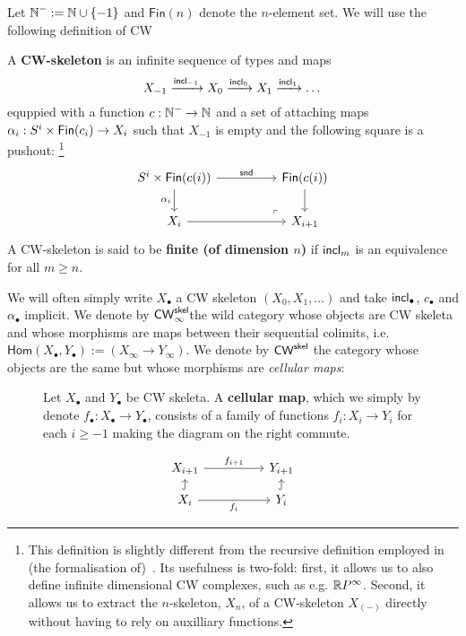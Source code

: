 \documentclass[a4page]{article}
\begin{document}
Let $\textsf{$\mathbb{N}$}^{-} := \textsf{$\mathbb{N}$} \cup \{-1\}$ and $\mathsf{Fin}(n)$ denote the $n$-element set. We will use the following definition of CW
\begin{definition}[CW skeleta]
  A \textbf{CW-skeleton} is an infinite sequence of types and maps
  \[X_{-1} \xrightarrow{\textnormal{\ensuremath{\mathsf{incl}_{-1}}}} X_0 \xrightarrow{\textnormal{\ensuremath{\mathsf{incl}_{0}}}} X_1 \xrightarrow{\textnormal{\ensuremath{\mathsf{incl}_{1}}}} \dots \]
  equppied with a function $c : \textsf{$\mathbb{N}$}^- \to \textsf{$\mathbb{N}$}$ and a set of attaching maps $\alpha_i : S^i \times \textnormal{\ensuremath{\mathsf{Fin}({c_i})}} \to X_i$ such that $X_{-1}$ is empty and the following square is a pushout:
  \footnote{This definition is slightly different from the
  recursive definition employed in (the formalisation
  of)~\cite{BuchholtzFavonia18}. Its usefulness is two-fold: first, it
  allows us to also define infinite dimensional CW complexes, such as
  e.g. $\textnormal{\ensuremath{\mathbb{R}P^\infty}}$. Second, it allows us to extract the $n$-skeleton,
  $X_n$, of a CW-skeleton $X_{(-)}$ directly without having to rely on
  auxilliary functions.}
  \[
\begin{tikzcd}[ampersand replacement=\&]
	{S^{i} \times \fin{c(i)}} \&\& \fin{c(i)} \\
	{X_i} \&\& {X_{i+1}}
	\arrow["{\mathsf{snd}}", from=1-1, to=1-3]
	\arrow["{\alpha_{i}}"', from=1-1, to=2-1]
	\arrow[from=2-1, to=2-3]
	\arrow[from=1-3, to=2-3]
	\arrow["\lrcorner"{anchor=center, pos=0.125, rotate=180}, draw=none, from=2-3, to=1-1]
\end{tikzcd}
\]
A CW-skeleton is said to be \textbf{finite (of dimension $n$)} if $\textnormal{\ensuremath{\mathsf{incl}_{m}}}$ is an equivalence for all $m \geq n$.
\end{definition}
We will often simply write $X_\bullet$ a CW skeleton $(X_0,X_1,\dots)$ and take $\textnormal{\ensuremath{\mathsf{incl}_{\bullet}}}$, $c_{\bullet}$ and $ \alpha_{\bullet}$ implicit. We denote by $\textnormal{\ensuremath{\mathsf{CW}_\infty^{\mathsf{skel}}}}$the wild category whose objects are CW skeleta and whose morphisms are maps between their sequential colimits, i.e. $\mathsf{Hom}(X_\bullet,Y_\bullet) := (X_\infty \to Y_\infty)$. We denote by $\textnormal{\ensuremath{\mathsf{CW}^{\mathsf{skel}}}}$ the category whose objects are the same but whose morphisms are \emph{cellular maps}:
\begin{figure}[H]
\vspace{-.2cm}
\begin{minipage}[t]{0.7 \linewidth}
\begin{definition}
  Let $X_\bullet$ and $Y_\bullet$ be CW skeleta. A \textbf{cellular map}, which we simply by denote $f_\bullet : X_\bullet \to Y_\bullet$, consists of a family of functions $f_i : X_i \to Y_i$ for each $i \geq -1$ making the diagram on the right commute.
\end{definition}
\end{minipage}
\hspace{.15cm}
\begin{minipage}[t]{0.3 \linewidth}
  \vspace{-.65cm}
  \[
\begin{tikzcd}[ampersand replacement=\& , row sep = small]
	{X_{i+1}} \&\& {Y_{i+1}} \\
	{X_i} \&\& {Y_i}
	\arrow["{f_{i+1}}", from=1-1, to=1-3]
	\arrow["{f_{i}}"', from=2-1, to=2-3]
	\arrow[hook, from=2-1, to=1-1]
	\arrow[hook, from=2-3, to=1-3]
\end{tikzcd}
\]
\end{minipage}
\end{figure}
\end{document}
